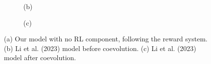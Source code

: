 \documentclass[9pt]{pnas-new}
\begin{document}
\begin{figure}[ht]
\begin{subfigure}{0.30\textwidth}
		\vspace{0.5em}
		\centering (b)
	\end{subfigure}
	\hfill
	\begin{subfigure}{0.30\textwidth}
		\centering
		\vspace{0.5em}
		\centering (c)
	\end{subfigure}
	
	\caption{(a) Our model with no RL component, following the reward system. (b) Li et al. (2023) model before coevolution. (c) Li et al. (2023) model after coevolution.}
	\label{fig:three_images}
\end{figure}
\end{document}
